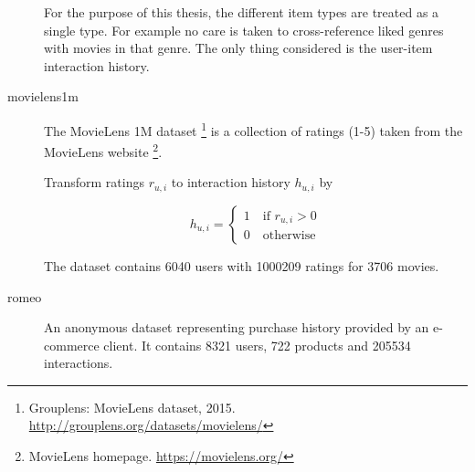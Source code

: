 \begin{description}
        For the purpose of this thesis, the different item types are treated as a single type. For example no care is taken to cross-reference liked genres with movies in that genre. The only thing considered is the user-item interaction history.





    \item[movielens1m] \hfill

        The MovieLens 1M dataset \footnote{Grouplens: MovieLens dataset, 2015. \url{http://grouplens.org/datasets/movielens/}} is a collection of ratings (1-5) taken from the MovieLens website \footnote{MovieLens homepage. \url{https://movielens.org/}}.

        Transform ratings $r_{u, i}$ to interaction history $h_{u, i}$ by

        \begin{equation}\label{eq:hist}
            h_{u, i} = \begin{cases}
                1 \quad \text{if } r_{u, i} > 0 \\
                0 \quad \text{otherwise}
            \end{cases}
        \end{equation}

        The dataset contains 6040 users with 1000209 ratings for 3706 movies.



    \item[romeo] \hfill

        An anonymous dataset representing purchase history provided by an e-commerce client. It contains 8321 users, 722 products and 205534 interactions.




\end{description}

